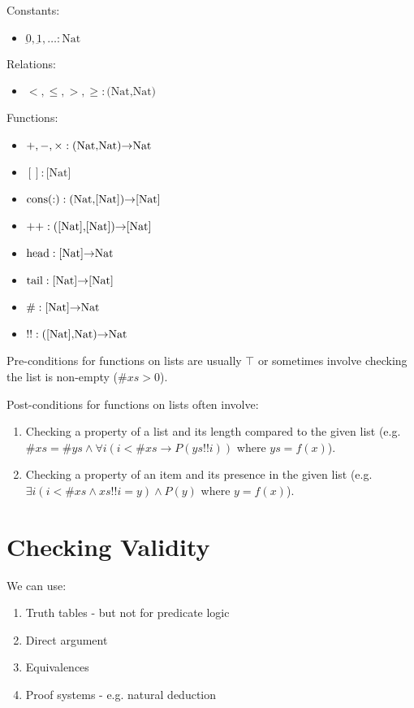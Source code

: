 \documentclass[10pt,twoside,twocolumn]{article}
\begin{document}
Constants:
\begin{itemize}
\item $\underbar{0},\underbar{1},\dots:\mbox{Nat}$
\end{itemize}
Relations:
\begin{itemize}
\item $<,\leq,>,\geq:\mbox{(Nat,Nat)}$
\end{itemize}
Functions:
\begin{itemize}
\item $+,-,\times:\mbox{(Nat,Nat)\ensuremath{\rightarrow}Nat}$
\item $[]:\mbox{[Nat]}$
\item $\mbox{cons}(:):\mbox{(Nat,[Nat])\ensuremath{\rightarrow}[Nat]}$
\item $++:\mbox{([Nat],[Nat])\ensuremath{\rightarrow}[Nat]}$
\item $\mbox{head}:\mbox{[Nat]\ensuremath{\rightarrow}Nat}$
\item $\mbox{tail}:\mbox{[Nat]\ensuremath{\rightarrow}[Nat]}$
\item $\#:\mbox{[Nat]\ensuremath{\rightarrow}Nat}$
\item $!!:\mbox{([Nat],Nat)\ensuremath{\rightarrow}Nat}$
\end{itemize}

Pre-conditions for functions on lists are usually $\top$ or sometimes involve checking the list is non-empty ($\#xs > 0$).

Post-conditions for functions on lists often involve:
\begin{enumerate}
\item Checking a property of a list and its length compared to the given list (e.g. $\#xs = \#ys \land \forall i \left(i < \#xs \rightarrow P\left(ys!!i\right)\right)$ where $ys = f(x)$).
\item Checking a property of an item and its presence in the given list (e.g. $\exists i \left(i < \#xs \land xs!!i = y\right) \land P\left(y\right)$ where $y = f(x)$).
\end{enumerate}

\section{Checking Validity}

We can use:
\begin{enumerate}
\item Truth tables - but not for predicate logic
\item Direct argument
\item Equivalences
\item Proof systems - e.g. natural deduction
\end{enumerate}
\end{document}
